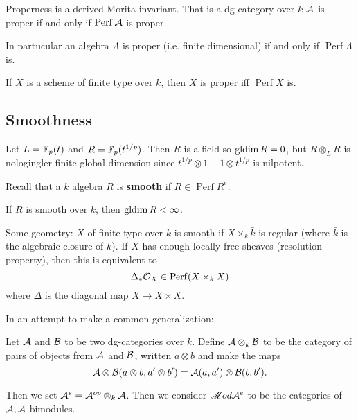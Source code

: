 \documentclass[12pt]{article}
\begin{document}
\begin{lem}
	Properness is a derived Morita invariant. That is a dg category over $k$ $\mathcal{A}$ is proper if and only if $\operatorname{Perf}\mathcal{A}$ is proper.
\end{lem}
\begin{rmk}
In partucular an algebra $\Lambda$ is proper (i.e. finite dimensional) if and only if $\operatorname{Perf}\Lambda$ is.
\end{rmk}
\begin{thm}[Lipmon?]
	If $X$ is a scheme of finite type over $k$, then $X$ is proper iff $\operatorname{Perf}X$ is.
\end{thm}

\subsection{Smoothness}
Let $L=\mathbb{F}_p(t)$ and $R=\mathbb{F}_p(t^{1/p})$. Then $R$ is a field so $\operatorname{gldim} R=0$, but 
$R\otimes_LR$ is nologingler finite global dimension since $t^{1/p}\otimes 1-1\otimes t^{1/p}$ is nilpotent.

\begin{defn}
	Recall that a $k$ algebra $R$ is \textbf{smooth} if $R\in\operatorname{Perf}R^e$.
\end{defn}
\begin{lem}
	If $R$ is smooth over $k$, then $\operatorname{gldim} R<\infty$.
\end{lem}

Some geometry: $X$ of finite type over $k$ is smooth if $X\times_k \bar k$ is regular (where $\bar k$ is the algebraic closure of $k$). If $X$ has enough locally free sheaves (resolution property),
then this is equivalent to 
\[\Delta_\ast\mathcal{O}_X\in\operatorname{Perf}(X\times_k X)\]
where $\Delta$ is the diagonal map $X\to X\times X$.

In an attempt to make a common generalization:
\begin{defn}
	Let $\mathcal{A}$ and $\mathcal{B}$ to be two dg-categories over $k$. Define $\mathcal{A}\otimes_k \mathcal{B}$ to be the category of pairs of 
	objects from $\mathcal{A}$ and $\mathcal{B}$, written $a\otimes b$ and make the maps 
	\[\mathcal{A}\otimes \mathcal{B}(a\otimes b,a'\otimes b')=\mathcal{A}(a,a')\otimes \mathcal{B}(b,b').\]
\end{defn}
Then we set $\mathcal{A}^e=\mathcal{A}^{op}\otimes_k\mathcal{A}$. Then we consider $\mathscr{M} od\mathcal{A}^e$ to be the categories of $\mathcal{A},\mathcal{A}$-bimodules.
\end{document}
